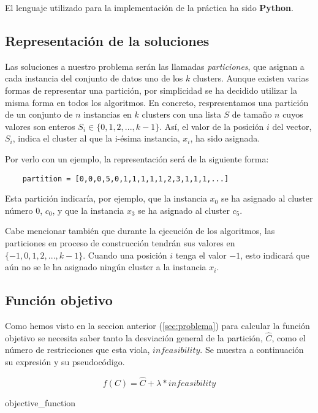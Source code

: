 \documentclass[11pt,a4paper]{article}
\begin{document}
	El lenguaje utilizado para la implementación de la práctica ha sido \textbf{Python}. 
	
	\subsection{Representación de la soluciones}
	Las soluciones a nuestro problema serán las llamadas \textit{particiones}, que asignan a cada instancia del conjunto de datos uno de los $k$ clusters. Aunque existen varias formas de representar una partición, por simplicidad se ha decidido utilizar la misma forma en todos los algoritmos. En concreto, respresentamos una partición de un conjunto de $n$ instancias en $k$ clusters con una lista $S$ de tamaño $n$ cuyos valores son enteros $S_i \in \{0,1,2,...,k-1\}$. Así, el valor de la posición $i$ del vector, $S_i$, indica el cluster al que la i-ésima instancia, $x_i$, ha sido asignada. 
	
	Por verlo con un ejemplo, la representación será de la siguiente forma:

	\begin{lstlisting}
	partition = [0,0,0,5,0,1,1,1,1,1,2,3,1,1,1,...]
	\end{lstlisting}
	Esta partición indicaría, por ejemplo, que la instancia $x_0$ se ha asignado al cluster número 0, $c_0$, y que la instancia $x_3$ se ha asignado al cluster $c_5$. 
	
	Cabe mencionar también que durante la ejecución de los algoritmos, las particiones en proceso de construcción tendrán sus valores en $\{-1,0,1,2,...,k-1\}$. Cuando una posición $i$ tenga el valor $-1$, esto indicará que aún no se le ha asignado ningún cluster a la instancia $x_i$.
	
	\subsection{Función objetivo}
	Como hemos visto en la seccion anterior (\ref{sec:problema}) para calcular la función objetivo se necesita saber tanto la desviación general de la partición, $\hat{C}$, como el número de restricciones que esta viola, $infeasibility$. Se muestra a continuación su expresión y su pseudocódigo. 
	
	$$f(C) = \hat{C} + \lambda * infeasibility$$

	\begin{algorithm}
	 	\caption{objective\_function}
	\end{algorithm}
	
\end{document}
